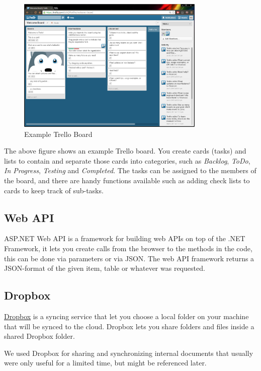 \begin{figure}[H]
\centering
\includegraphics[width=0.8\textwidth]{images/Trello.png}
\caption{Example Trello Board}
\label{fig:Trello}
\end{figure}

The above figure shows an example Trello board. You create cards (tasks) and lists to contain and separate those cards into categories, such as \emph{Backlog}, \emph{ToDo}, \emph{In Progress}, \emph{Testing} and \emph{Completed}. The tasks can be assigned to the members of the board, and there are handy functions available such as adding check lists to cards to keep track of sub-tasks.

\subsection{Web API}

ASP.NET Web API is a framework for building web APIs on top of the .NET Framework, it lets you create calls from the browser to the methods in the code, this can be done via parameters or via JSON. The web API framework returns a JSON-format of the given item, table or whatever was requested.

\subsection{Dropbox}
\href{http://www.dropbox.com}{Dropbox} is a syncing service that let you choose a local folder on your machine that will be synced to the cloud. Dropbox lets you share folders and files inside a shared Dropbox folder.

We used Dropbox for sharing and synchronizing internal documents that usually were only useful for a limited time, but might be referenced later.

